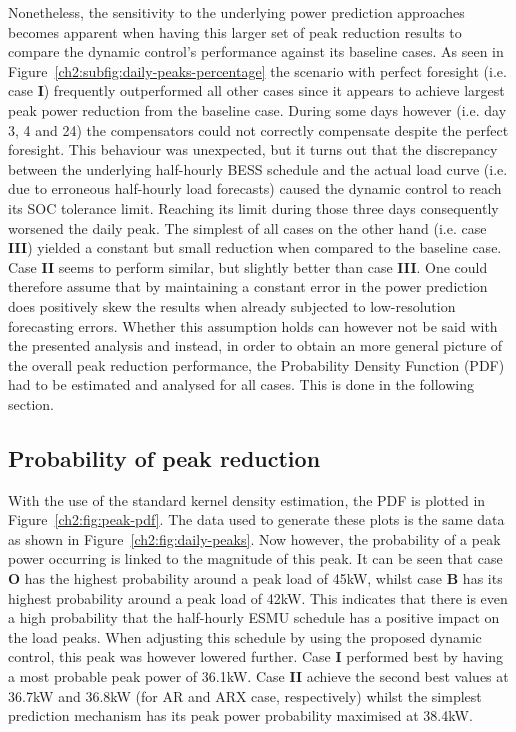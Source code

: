 Nonetheless, the sensitivity to the underlying power prediction approaches becomes apparent when having this larger set of peak reduction results to compare the dynamic control's performance against its baseline cases.
As seen in Figure~\ref{ch2:subfig:daily-peaks-percentage} the scenario with perfect foresight (i.e. case \textbf{I}) frequently outperformed all other cases since it appears to achieve largest peak power reduction from the baseline case.
During some days however (i.e. day 3, 4 and 24) the compensators could not correctly compensate despite the perfect foresight.
This behaviour was unexpected, but it turns out that the discrepancy between the underlying half-hourly BESS schedule and the actual load curve (i.e. due to erroneous half-hourly load forecasts) caused the dynamic control to reach its SOC tolerance limit.
Reaching its limit during those three days consequently worsened the daily peak.
The simplest of all cases on the other hand (i.e. case \textbf{III}) yielded a constant but small reduction when compared to the baseline case.
Case \textbf{II} seems to perform similar, but slightly better than case \textbf{III}.
One could therefore assume that by maintaining a constant error in the power prediction does positively skew the results when already subjected to low-resolution forecasting errors.
Whether this assumption holds can however not be said with the presented analysis and instead, in order to obtain an more general picture of the overall peak reduction performance, the Probability Density Function (PDF) had to be estimated and analysed for all cases.
This is done in the following section.

\subsection{Probability of peak reduction}
\label{ch2:subsec:probability-of-peak-reduction}



With the use of the standard kernel density estimation, the PDF is plotted in Figure~\ref{ch2:fig:peak-pdf}.
The data used to generate these plots is the same data as shown in Figure~\ref{ch2:fig:daily-peaks}.
Now however, the probability of a peak power occurring is linked to the magnitude of this peak.
It can be seen that case \textbf{O} has the highest probability around a peak load of 45kW, whilst case \textbf{B} has its highest probability around a peak load of 42kW.
This indicates that there is even a high probability that the half-hourly ESMU schedule has a positive impact on the load peaks.
When adjusting this schedule by using the proposed dynamic control, this peak was however lowered further.
Case \textbf{I} performed best by having a most probable peak power of 36.1kW.
Case \textbf{II} achieve the second best values at 36.7kW and 36.8kW (for AR and ARX case, respectively) whilst the simplest prediction mechanism has its peak power probability maximised at 38.4kW.

